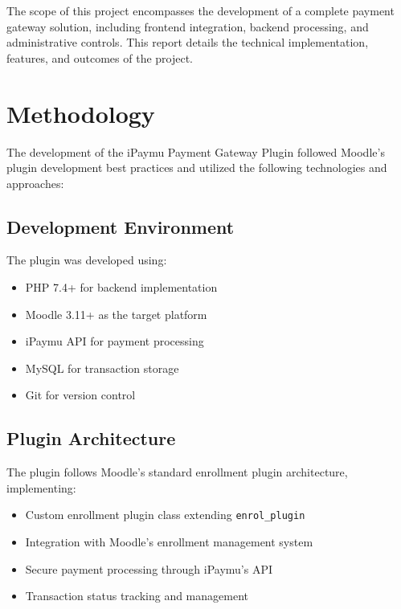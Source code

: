 \documentclass{article} %
\begin{document}
    The scope of this project encompasses the development of a complete payment gateway solution, including frontend integration, backend processing, and administrative controls. This report details the technical implementation, features, and outcomes of the project.

\section{Methodology}
    The development of the iPaymu Payment Gateway Plugin followed Moodle's plugin development best practices and utilized the following technologies and approaches:

    \subsection{Development Environment}
    The plugin was developed using:
    \begin{itemize}
        \item PHP 7.4+ for backend implementation
        \item Moodle 3.11+ as the target platform
        \item iPaymu API for payment processing
        \item MySQL for transaction storage
        \item Git for version control
    \end{itemize}

    \subsection{Plugin Architecture}
    The plugin follows Moodle's standard enrollment plugin architecture, implementing:
    \begin{itemize}
        \item Custom enrollment plugin class extending \texttt{enrol\_plugin}
        \item Integration with Moodle's enrollment management system
        \item Secure payment processing through iPaymu's API
        \item Transaction status tracking and management
    \end{itemize}
\end{document}
